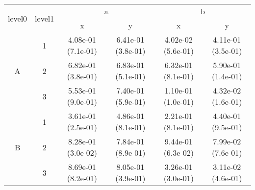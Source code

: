 \begin{tabular}{cccccc}
\toprule
\multirow{2}{*}{level0} & \multirow{2}{*}{level1}&\multicolumn{2}{c}{a}&\multicolumn{2}{c}{b}\tabularnewline
\cmidrule(lr){3-4}
\cmidrule(lr){5-6}
&&x&y&x&y\tabularnewline
\midrule
\multirow{3}{*}{A}&1& 4.08e-01 (7.1e-01)& 6.41e-01 (3.8e-01)& 4.02e-02 (5.6e-01)& 4.11e-01 (3.5e-01)\tabularnewline
&2& 6.82e-01 (3.8e-01)& 6.83e-01 (5.1e-01)& 6.32e-01 (8.1e-01)& 5.90e-01 (1.4e-01)\tabularnewline
&3& 5.53e-01 (9.0e-01)& 7.40e-01 (5.9e-01)& 1.10e-01 (1.0e-01)& 4.32e-02 (1.6e-01)\tabularnewline
\midrule
\multirow{3}{*}{B}&1& 3.61e-01 (2.5e-01)& 4.86e-01 (8.1e-01)& 2.21e-01 (8.1e-01)& 4.40e-01 (9.5e-01)\tabularnewline
&2& 8.28e-01 (3.0e-02)& 7.84e-01 (8.9e-01)& 9.44e-01 (6.3e-02)& 7.99e-02 (7.6e-01)\tabularnewline
&3& 8.69e-01 (8.2e-01)& 8.05e-01 (3.9e-01)& 3.26e-01 (3.0e-01)& 3.11e-02 (4.6e-01)\tabularnewline
\bottomrule
\end{tabular}
